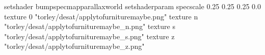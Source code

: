 setshader bumpspecmapparallaxworld
setshaderparam specscale 0.25 0.25 0.25 0.0
texture 0 "torley/desat/applytofurnituremaybe.png"
texture n "torley/desat/applytofurnituremaybe_n.png"
texture s "torley/desat/applytofurnituremaybe_s.png"
texture z "torley/desat/applytofurnituremaybe_z.png"

